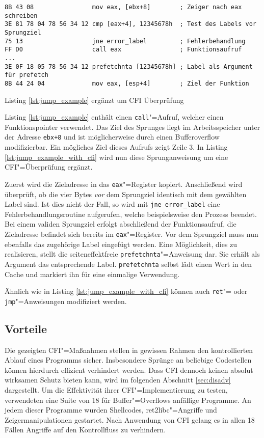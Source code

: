 \begin{listing}[ht]
\begin{verbatim}
8B 43 08                mov eax, [ebx+8]        ; Zeiger nach eax schreiben
3E 81 78 04 78 56 34 12 cmp [eax+4], 12345678h  ; Test des Labels vor Sprungziel
75 13                   jne error_label         ; Fehlerbehandlung
FF D0                   call eax                ; Funktionsaufruf
...
3E 0F 18 05 78 56 34 12 prefetchnta [12345678h] ; Label als Argument für prefetch
8B 44 24 04             mov eax, [esp+4]        ; Ziel der Funktion
\end{verbatim}
\caption{Listing \ref{lst:jump_example} ergänzt um CFI Überprüfung}
\label{lst:jump_example_with_cfi}
\end{listing}

Listing \ref{lst:jump_example} enthält einen \texttt{call}"=Aufruf, welcher einen Funktionspointer verwendet. Das Ziel des Sprunges liegt im Arbeitsspeicher unter der Adresse \texttt{ebx+8} und ist möglicherweise durch einen Bufferoverflow modifizierbar. Ein mögliches Ziel dieses Aufrufs zeigt Zeile 3. In Listing \ref{lst:jump_example_with_cfi} wird nun diese Sprunganweisung um eine CFI"=Überprüfung ergänzt.

Zuerst wird die Zieladresse in das \texttt{eax}"=Register kopiert. Anschließend wird überprüft, ob die vier Bytes \emph{vor} dem Sprungziel identisch mit dem gewählten Label sind. Ist dies nicht der Fall, so wird mit \texttt{jne error_label} eine Fehlerbehandlungsroutine aufgerufen, welche beispielsweise den Prozess beendet. Bei einem validen Sprungziel erfolgt abschließend der Funktionsaufruf, die Zieladresse befindet sich bereits im \texttt{eax}"=Register. Vor dem Sprungziel muss nun ebenfalls das zugehörige Label eingefügt werden. Eine Möglichkeit, dies zu realisieren, stellt die seiteneffektfreie \texttt{prefetchnta}"=Anweisung dar. Sie erhält als Argument das entsprechende Label. \texttt{prefetchnta} selbst lädt einen Wert in den Cache und markiert ihn für eine einmalige Verwendung.

Ähnlich wie in Listing \ref{lst:jump_example_with_cfi} können auch \texttt{ret}"= oder \texttt{jmp}"=Anweisungen modifiziert werden.


\subsection{Vorteile}

Die gezeigten CFI"=Maßnahmen stellen in gewissen Rahmen den kontrollierten Ablauf eines Programms sicher. Insbesondere Sprünge an beliebige Codestellen können hierdurch effizient verhindert werden. Dass CFI dennoch keinen absolut wirksamen Schutz bieten kann, wird im folgenden Abschnitt \ref{sec:disadv} dargestellt.
Um die Effektivität ihrer CFI"=Implementierung zu testen, verwendeten \cite{Abadi.2009} eine Suite von 18 für Buffer"=Overflows anfällige Programme. An jedem dieser Programme wurden Shellcodes, ret2libc"=Angriffe und Zeigermanipulationen gestartet. Nach Anwendung von CFI gelang es in allen 18 Fällen Angriffe auf den Kontrollfluss zu verhindern.

